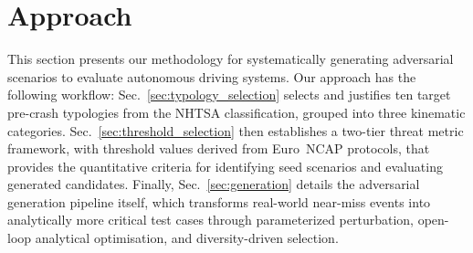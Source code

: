 \section{Approach}
\label{sec:approach}

This section presents our methodology for systematically generating adversarial scenarios to evaluate autonomous driving systems. Our approach has the following workflow: Sec.~\ref{sec:typology_selection} selects and justifies ten target pre-crash typologies from the NHTSA classification, grouped into three kinematic categories. Sec.~\ref{sec:threshold_selection} then establishes a two-tier threat metric framework, with threshold values derived from Euro~NCAP protocols, that provides the quantitative criteria for identifying seed scenarios and evaluating generated candidates. Finally, Sec.~\ref{sec:generation} details the adversarial generation pipeline itself, which transforms real-world near-miss events into analytically more critical test cases through parameterized perturbation, open-loop analytical optimisation, and diversity-driven selection.
